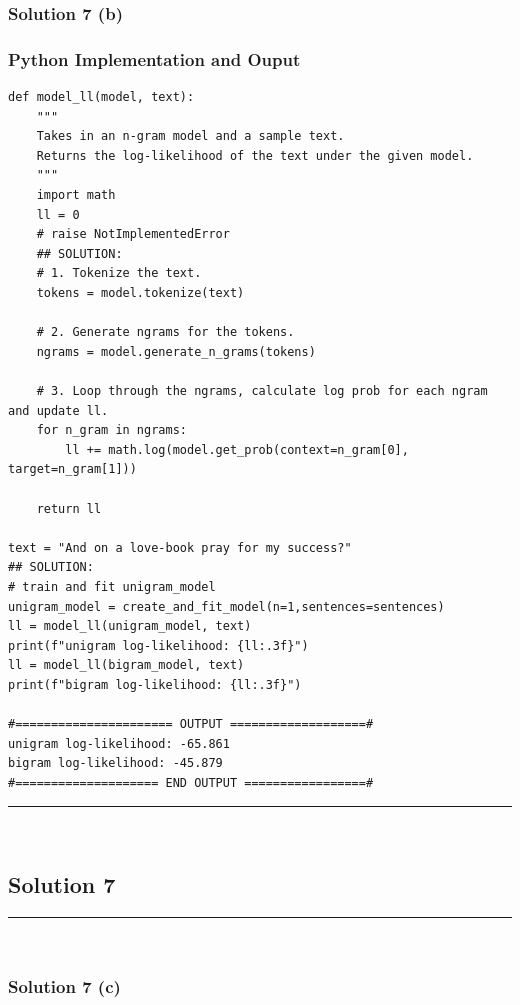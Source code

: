 \documentclass{article}
\begin{document}
\subsubsection*{Solution 7 (b)}

\subsubsection*{Python Implementation and Ouput}

\begin{lstlisting}
def model_ll(model, text):
    """
    Takes in an n-gram model and a sample text.
    Returns the log-likelihood of the text under the given model.
    """
    import math
    ll = 0
    # raise NotImplementedError
    ## SOLUTION:
    # 1. Tokenize the text.
    tokens = model.tokenize(text)

    # 2. Generate ngrams for the tokens.
    ngrams = model.generate_n_grams(tokens)

    # 3. Loop through the ngrams, calculate log prob for each ngram and update ll.
    for n_gram in ngrams:
        ll += math.log(model.get_prob(context=n_gram[0], target=n_gram[1]))
    
    return ll

text = "And on a love-book pray for my success?"
## SOLUTION:
# train and fit unigram_model
unigram_model = create_and_fit_model(n=1,sentences=sentences)
ll = model_ll(unigram_model, text)
print(f"unigram log-likelihood: {ll:.3f}")
ll = model_ll(bigram_model, text)
print(f"bigram log-likelihood: {ll:.3f}")

#====================== OUTPUT ===================# 
unigram log-likelihood: -65.861
bigram log-likelihood: -45.879
#==================== END OUTPUT =================#
\end{lstlisting}

\noindent\rule{\textwidth}{0.4pt}\\

\newpage

\subsection*{Solution 7}
\noindent\rule{\textwidth}{0.4pt}\\
\subsubsection*{Solution 7 (c)}
\end{document}

